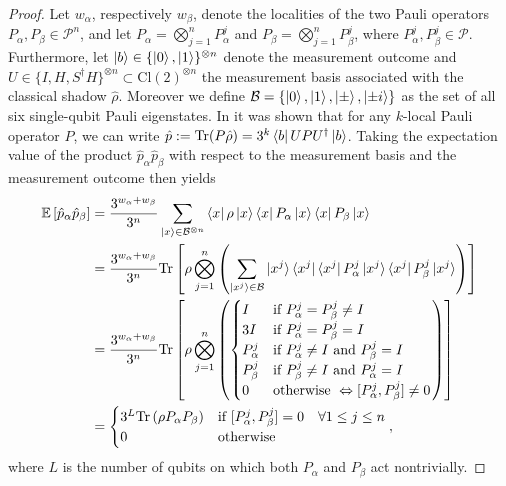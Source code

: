 \begin{proof}
    Let $w_\alpha$, respectively $w_\beta$, denote the localities of the two Pauli operators $P_\alpha,P_\beta\in\mathcal{P}^n$, and let $P_\alpha = \bigotimes^n_{j=1}P_\alpha^j$ and $P_\beta = \bigotimes^n_{j=1}P_\beta^j$, where $P^j_\alpha,P^j_\beta\in\mathcal{P}$. Furthermore, let $\ket{b}\in\{\ket{0},\ket{1}\}^{\otimes n}$ denote the measurement outcome and $U\in\{I,H,S^\dagger H\}^{\otimes n}\subset \mathrm{Cl}(2)^{\otimes n}$ the measurement basis associated with the classical shadow $\hat{\rho}$. Moreover we define $\mathcal{B}=\{\ket{0},\ket{1},\ket{\pm}, \ket{\pm i}\}$ as the set of all six single-qubit Pauli eigenstates. In \cite{huang2020predicting} it was shown that for any $k$-local Pauli operator $P$, we can write $\hat{p}:=\mathrm{Tr}(P\hat{\rho})=3^k\bra{b}U P U^\dagger\ket{b}$. Taking the expectation value of the product $\hat{p}_\alpha \hat{p}_\beta$ with respect to the measurement basis and the measurement outcome then yields
    \begin{align}
        \mathbb{E}\left[\hat{p}_\alpha \hat{p}_\beta\right]&=\frac{3^{w_\alpha + w_\beta}}{3^n}\sum_{\ket{x}\in \mathcal{B}^{\otimes n}}\bra{x}\rho\ket{x}\bra{x}P_\alpha\ket{x}\bra{x}P_\beta\ket{x} \\
        &=\frac{3^{w_\alpha + w_\beta}}{3^n}\mathrm{Tr}\left[\rho\bigotimes^n_{j=1}\left(\sum_{\ket{x^j}\in \mathcal{B}}\ket{x^j}\bra{x^j}\bra{x^j}P_\alpha^j\ket{x^j}\bra{x^j}P^j_\beta\ket{x^j} \right) \right]  \\
        &=\frac{3^{w_\alpha + w_\beta}}{3^n}\mathrm{Tr}\left[\rho\bigotimes^n_{j=1}\left(\begin{cases}
            I & \text{if } P^j_\alpha=P^j_\beta\neq I \\
        3I & \text{if } P^j_\alpha=P^j_\beta= I \\
        P^j_\alpha & \text{if } P^j_\alpha\neq I\text{ and }P^j_\beta= I \\
        P^j_\beta & \text{if } P^j_\beta\neq I\text{ and }P^j_\alpha= I \\
        0 & \text{otherwise }\Leftrightarrow [P^j_\alpha,P^j_\beta]\neq0
        \end{cases} \right) \right]\\
        &=\begin{cases}
            3^L\mathrm{Tr}\left(\rho P_\alpha P_\beta\right)& \text{if }[P^j_\alpha, P^j_\beta]=0\quad\forall1\leq j\leq n\\
        0 &\text{otherwise}
        \end{cases},
    \end{align}
    where $L$ is the number of qubits on which both $P_\alpha$ and $P_\beta$ act nontrivially.
\end{proof}

